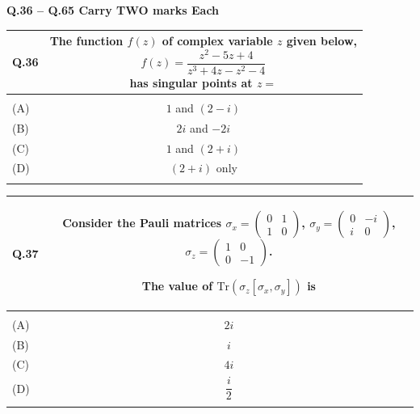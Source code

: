 \documentclass[12pt,a4paper]{article}
\begin{document}
\clearpage
\newpage

\newpage
\noindent\textbf{Q.36 -- Q.65 Carry TWO marks Each}

\vspace{0.4cm}

\begin{table}[h!]
\begin{tabular}{|L|C|}
\hline
Q.36 &
The function $f(z)$ of complex variable $z$ given below,
\[
  f(z) = \frac{z^2 - 5z + 4}{z^3 + 4z - z^2 - 4}
\]
has singular points at $z =$ \underline{\hspace{1.5cm}} \\
\hline
 & \\
\hline
(A) & $1$ and $(2-i)$ \\
\hline
(B) & $2i$ and $-2i$ \\
\hline
(C) & $1$ and $(2+i)$ \\
\hline
(D) & $(2+i)$ only \\
\hline
 & \\
\hline
\end{tabular}
\end{table}

\vspace{0.4cm}

\begin{table}[h!]
\begin{tabular}{|L|C|}
\hline
Q.37 &
Consider the Pauli matrices
$\sigma_x = \begin{pmatrix} 0 & 1 \\ 1 & 0 \end{pmatrix}$,\;
$\sigma_y = \begin{pmatrix} 0 & -i \\ i & 0 \end{pmatrix}$,\;
$\sigma_z = \begin{pmatrix} 1 & 0 \\ 0 & -1 \end{pmatrix}$.

\medskip
The value of $\mathrm{Tr}\!\left(\sigma_z\left[\sigma_x, \sigma_y\right]\right)$ is \\
\hline
 & \\
\hline
(A) & $2i$ \\
\hline
(B) & $i$ \\
\hline
(C) & $4i$ \\
\hline
(D) & \rule{0pt}{1.2cm} $\dfrac{i}{2}$ \\
\hline
 & \\
\hline
\end{tabular}
\end{table}
\end{document}
